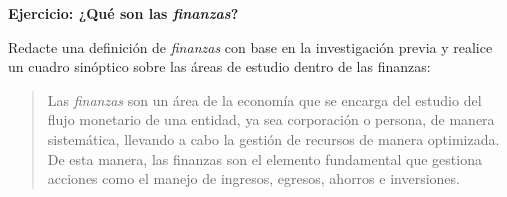 \documentclass[a4paper,12pt]{article}
\begin{document}
\textbf{\Large Ejercicio: ¿Qué son las \emph{finanzas}?}\\
\vspace{0.5cm}

Redacte una definición de \emph{finanzas} con base en la investigación previa y realice un cuadro sinóptico sobre las áreas de estudio dentro de las finanzas:\par

\begin{quotation}
	Las \emph{finanzas} son un área de la economía que se encarga del estudio del flujo monetario de una entidad, ya sea corporación o persona, de manera sistemática, llevando a cabo la gestión de recursos de manera optimizada. De esta manera, las finanzas son el elemento fundamental que gestiona acciones como el manejo de ingresos, egresos, ahorros e inversiones.
\end{quotation}

\vspace{3cm}

\begin{figure}[h!]
	\centering
	
	\schema
		{}
		{
				{}
			\vspace{3cm}
				{}
			\vspace{3cm}
			\schema
				{}
				{
						{
							{}
						}
				}
		}
	
\end{figure}
\end{document}
